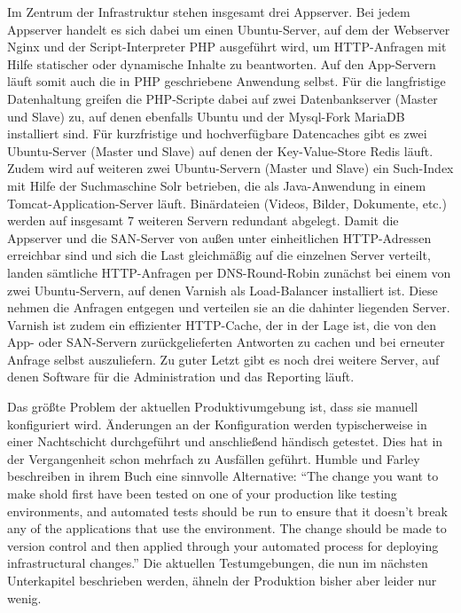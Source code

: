 Im Zentrum der Infrastruktur stehen insgesamt drei Appserver. Bei jedem Appserver handelt es sich dabei um einen Ubuntu-Server, auf dem der Webserver Nginx \citep{nginx:001} und der Script-Interpreter \ac{PHP} \citep{php:001} ausgeführt wird, um HTTP-Anfragen mit Hilfe statischer oder dynamische Inhalte zu beantworten. Auf den App-Servern läuft somit auch die in \ac{PHP} geschriebene Anwendung selbst. Für die langfristige Datenhaltung greifen die PHP-Scripte dabei auf zwei Datenbankserver (Master und Slave) zu, auf denen ebenfalls Ubuntu und der Mysql-Fork MariaDB \citep{mariadb:001} installiert sind. Für kurzfristige und hochverfügbare Datencaches gibt es zwei Ubuntu-Server (Master und Slave) auf denen der Key-Value-Store Redis \citep{redis:001} läuft. Zudem wird auf weiteren zwei Ubuntu-Servern (Master und Slave) ein Such-Index mit Hilfe der Suchmaschine Solr \citep{solr:001} betrieben, die als Java-Anwendung in einem Tomcat-Application-Server \citep{tomcat:001} läuft. Binärdateien (Videos, Bilder, Dokumente, etc.) werden auf insgesamt 7 weiteren Servern redundant abgelegt. Damit die Appserver und die SAN-Server von außen unter einheitlichen HTTP-Adressen erreichbar sind und sich die Last gleichmäßig auf die einzelnen Server verteilt, landen sämtliche HTTP-Anfragen per DNS-Round-Robin zunächst bei einem von zwei Ubuntu-Servern, auf denen Varnish \citep{varnish:001} als Load-Balancer installiert ist. Diese nehmen die Anfragen entgegen und verteilen sie an die dahinter liegenden Server. Varnish ist zudem ein effizienter HTTP-Cache, der in der Lage ist, die von den App- oder SAN-Servern zurückgelieferten Antworten zu cachen und bei erneuter Anfrage selbst auszuliefern. Zu guter Letzt gibt es noch drei weitere Server, auf denen Software für die Administration und das Reporting läuft.

Das größte Problem der aktuellen Produktivumgebung ist, dass sie manuell konfiguriert wird. Änderungen an der Konfiguration werden typischerweise in einer Nachtschicht durchgeführt und anschließend händisch getestet. Dies hat in der Vergangenheit schon mehrfach zu Ausfällen geführt. Humble und Farley beschreiben in ihrem Buch eine sinnvolle Alternative: "`The change you want to make shold first have been tested on one of your production like testing environments, and automated tests should be run to ensure that it doesn't break any of the applications that use the environment. The change should be made to version control and then applied through your automated process for deploying infrastructural changes."' \citep[S.][S. 287]{HumFar10} Die aktuellen Testumgebungen, die nun im nächsten Unterkapitel beschrieben werden, ähneln der Produktion bisher aber leider nur wenig.

